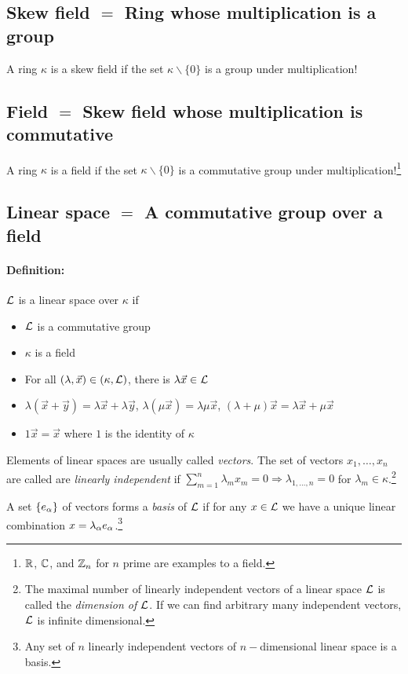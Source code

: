 \subsection{Skew field $=$ Ring whose multiplication is a group}
A ring $\kappa$ is a skew field if the set $\kappa\backslash \{0\}$ is a group under multiplication!
\subsection{Field $=$ Skew field whose multiplication is commutative}
A ring $\kappa$ is a field if the set $\kappa\backslash \{0\}$ is a commutative group under multiplication!\footnote{$\mathbb{R}$, $\mathbb{C}$, and $\mathbb{Z}_n$ for $n$ prime are examples to a field.}
	

\subsection{Linear space $=$ A commutative group over a field}
\paragraph{Definition:}$\mathcal{L}$ is a linear space over $\kappa$ if
\begin{itemize}
	\item  $\mathcal{L}$ is a commutative group
	\item $\kappa$ is a field
	\item For all $(\lambda,\vec{x})\in (\kappa,\mathcal{L})$, there is $\lambda \vec{x}\in \mathcal{L}$
	\item $\lambda(\vec{x}+\vec{y})=\lambda \vec{x}+\lambda \vec{y}$,\; $\lambda (\mu \vec{x})=\lambda \mu \vec{x}$,\; $(\lambda+\mu)\vec{x}=\lambda \vec{x}+\mu \vec{x}$
	\item $1\vec{x}=\vec{x}$ where $1$ is the identity of $\kappa$
\end{itemize}
Elements of linear spaces are usually called \emph{vectors}. The set of vectors $x_1,\dots,x_n$ are called are \emph{linearly independent} if $\sum\limits_{m=1}^{n}\lambda_mx_m=0 \Rightarrow \lambda_{1,\dots,n}=0$ for $\lambda_m\in \kappa$.\footnote{
The maximal number of linearly independent vectors of a linear space $\mathcal{L}$ is called the \emph{dimension of $\mathcal{L}$}. If we can find arbitrary many independent vectors, $\mathcal{L}$ is infinite dimensional.
}

A set $\{e_\alpha\}$ of vectors forms a \emph{basis} of $\mathcal{L}$ if for any $x\in \mathcal{L}$ we have a unique linear combination $x=\lambda_\alpha e_\alpha$.\footnote{Any set of $n$ linearly independent vectors of $n-$dimensional linear space is a basis.}


